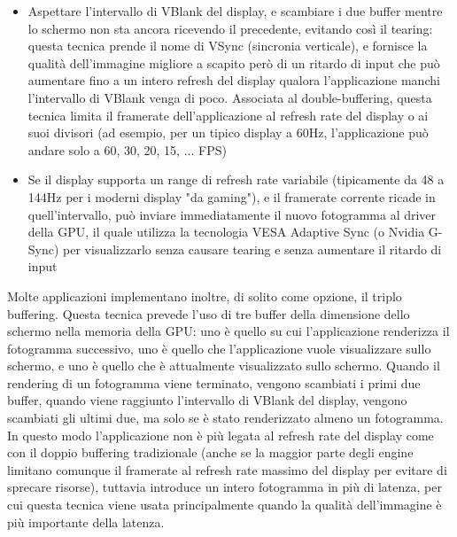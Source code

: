 \begin{itemize}
\begin{itemize}
		\item Aspettare l'intervallo di VBlank del display, e scambiare i due buffer mentre lo schermo non sta ancora ricevendo il precedente, evitando così il tearing: questa tecnica prende il nome di VSync (sincronia verticale), e fornisce la qualità dell'immagine migliore a scapito però di un ritardo di input che può aumentare fino a un intero refresh del display qualora l'applicazione manchi l'intervallo di VBlank venga di poco. Associata al double-buffering, questa tecnica limita il framerate dell'applicazione al refresh rate del display o ai suoi divisori (ad esempio, per un tipico display a 60Hz, l'applicazione può andare solo a 60, 30, 20, 15, ... FPS)
		\item Se il display supporta un range di refresh rate variabile (tipicamente da 48 a 144Hz per i moderni display "da gaming"), e il framerate corrente ricade in quell'intervallo, può inviare immediatamente il nuovo fotogramma al driver della GPU, il quale utilizza la tecnologia VESA Adaptive Sync (o Nvidia G-Sync) per visualizzarlo senza causare tearing e senza aumentare il ritardo di input
	\end{itemize}
	Molte applicazioni implementano inoltre, di solito come opzione, il triplo buffering. Questa tecnica prevede l'uso di tre buffer della dimensione dello schermo nella memoria della GPU: uno è quello su cui l'applicazione renderizza il fotogramma successivo, uno è quello che l'applicazione vuole visualizzare sullo schermo, e uno è quello che è attualmente visualizzato sullo schermo. Quando il rendering di un fotogramma viene terminato, vengono scambiati i primi due buffer, quando viene raggiunto l'intervallo di VBlank del display, vengono scambiati gli ultimi due, ma solo se è stato renderizzato almeno un fotogramma. In questo modo l'applicazione non è più legata al refresh rate del display come con il doppio buffering tradizionale (anche se la maggior parte degli engine limitano comunque il framerate al refresh rate massimo del display per evitare di sprecare risorse), tuttavia introduce un intero fotogramma in più di latenza, per cui questa tecnica viene usata principalmente quando la qualità dell'immagine è più importante della latenza.
\end{itemize}

